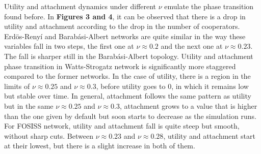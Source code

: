 \documentclass[11pt]{article}
\begin{document}
\FloatBarrier

Utility and attachment dynamics under different $\nu$ emulate the
phase transition found before. In \textbf{Figures 3 and 4}, it can be observed
that there is a drop in utility and attachment according to the
drop in the number of cooperators. Erd\"{o}s-Reny\'i and Barab\'asi-Albert
networks are quite similar in the way these variables fall in two steps, the
first one at $\nu \approx 0.2$ and the next one at $\nu \approx 0.23$. The fall
is sharper still in the Barab\'asi-Albert topology. Utility and attachment phase
transition in Watts-Strogatz network is significantly more 
staggered compared to the former networks. In the case of utility, there is a
region in the limits of $\nu \approx 0.25$ and $\nu \approx 0.3$, before utility
goes to $0$, in which it remains low but stable over time. In general,
attachment follows the same pattern as utility but in the same $\nu \approx 
0.25$ and $\nu \approx 0.3$, attachment grows to a value that is
higher than the one given by default but soon starts to decrease as the
simulation runs. For FOSISS network, utility and attachment fall
is quite steep but smooth, without sharp cuts. Between $\nu \approx 0.23$ and
$\nu \approx 0.28$, utility and attachment start at their lowest,
but there is a slight increase in both of them.
\end{document}
